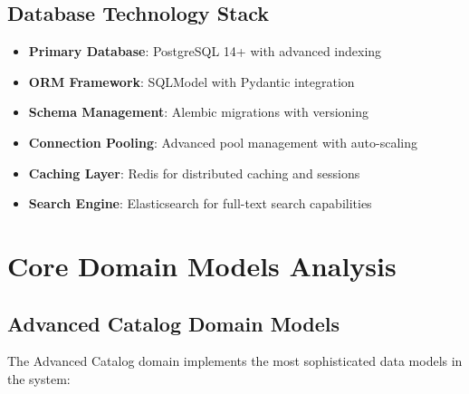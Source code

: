 \subsection{Database Technology Stack}

\begin{itemize}
    \item \textbf{Primary Database}: PostgreSQL 14+ with advanced indexing
    \item \textbf{ORM Framework}: SQLModel with Pydantic integration
    \item \textbf{Schema Management}: Alembic migrations with versioning
    \item \textbf{Connection Pooling}: Advanced pool management with auto-scaling
    \item \textbf{Caching Layer}: Redis for distributed caching and sessions
    \item \textbf{Search Engine}: Elasticsearch for full-text search capabilities
\end{itemize}

\section{Core Domain Models Analysis}

\subsection{Advanced Catalog Domain Models}

The Advanced Catalog domain implements the most sophisticated data models in the system:

